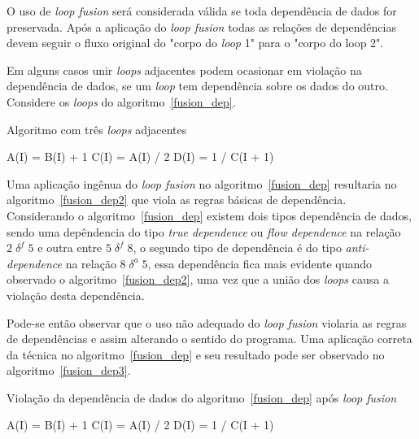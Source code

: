 O uso de \textit{loop fusion} será considerada válida se toda dependência de
dados for preservada.
Após a aplicação do \textit{loop fusion} todas as relações de dependências devem 
seguir o fluxo original do "corpo do \textit{loop} 1" para o "corpo do loop
2".

Em alguns casos unir \textit{loops} adjacentes podem ocasionar em violação na
dependência de dados, se um \textit{loop} tem dependência sobre os dados do
outro. Considere os \textit{loops} do algoritmo~\ref{fusion_dep}.

\begin{algorithm}
\caption{Algoritmo com três \textit{loops} adjacentes}
\label{fusion_dep}
\begin{algorithmic}[1]

\STATE A(I) = B(I) + 1
\ENDFOR
{}
\STATE C(I) = A(I) / 2
\ENDFOR
{}
\STATE D(I) = 1 / C(I + 1)
\ENDFOR

\end{algorithmic}
\end{algorithm}

Uma aplicação ingênua do \textit{loop fusion} no algoritmo~\ref{fusion_dep} 
resultaria no algoritmo~\ref{fusion_dep2} que viola as regras básicas de 
dependência.
Considerando o algoritmo~\ref{fusion_dep} existem dois tipos dependência 
de dados, sendo uma depêndencia do tipo \textit{true dependence} ou 
\textit{flow dependence} na relação $2 \; \delta^f \; 5$ e outra entre 
$5 \; \delta^f \; 8$, o segundo tipo de dependência é do tipo
\textit{anti-dependence} na relação $8 \; \delta^a \; 5$, essa dependência
fica mais evidente quando observado o algoritmo~\ref{fusion_dep2}, 
uma vez que a união dos \textit{loops} causa a violação desta dependência. 

Pode-se então observar que o uso não adequado do \textit{loop fusion} violaria
as regras de dependências e assim alterando o sentido do programa. 
Uma aplicação correta da técnica no algoritmo~\ref{fusion_dep} e seu 
resultado pode ser observado no algoritmo~\ref{fusion_dep3}.

\begin{algorithm}
\caption{Violação da dependência de dados do algoritmo~\ref{fusion_dep} após
        \textit{loop fusion}}
\label{fusion_dep2}
\begin{algorithmic}[1]

\STATE A(I) = B(I) + 1
\STATE C(I) = A(I) / 2
\STATE D(I) = 1 / C(I + 1)
\ENDFOR

\end{algorithmic}
\end{algorithm}

